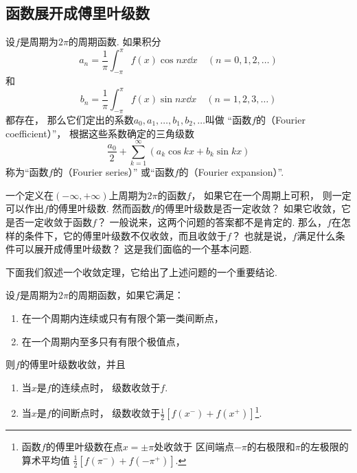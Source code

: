 \subsection{函数展开成傅里叶级数}
\begin{definition}\label{definition:无穷级数.傅里叶级数}
设\(f\)是周期为\(2 \pi\)的周期函数.
如果积分\[
	a_n = \frac{1}{\pi} \int_{-\pi}^\pi f(x) \cos nx \dd{x} \quad(n=0,1,2,\dotsc)
\]和\[
	b_n = \frac{1}{\pi} \int_{-\pi}^\pi f(x) \sin nx \dd{x} \quad(n=1,2,3,\dotsc)
\]都存在，
那么它们定出的系数\(a_0,a_1,\dotsc,b_1,b_2,\dotsc\)叫做%
“函数\(f\)的（Fourier coefficient）”，
根据这些系数确定的三角级数\[
	\frac{a_0}{2} + \sum_{k=1}^\infty (a_k \cos{kx} + b_k \sin kx)
\]称为“函数\(f\)的（Fourier series）”
或“函数\(f\)的（Fourier expansion）”.
\end{definition}

一个定义在\((-\infty,+\infty)\)上周期为\(2\pi\)的函数\(f\)，
如果它在一个周期上可积，
则一定可以作出\(f\)的傅里叶级数.
然而函数\(f\)的傅里叶级数是否一定收敛？
如果它收敛，它是否一定收敛于函数\(f\)？
一般说来，这两个问题的答案都不是肯定的.
那么，\(f\)在怎样的条件下，它的傅里叶级数不仅收敛，而且收敛于\(f\)？
也就是说，\(f\)满足什么条件可以展开成傅里叶级数？
这是我们面临的一个基本问题.

下面我们叙述一个收敛定理，它给出了上述问题的一个重要结论.
\begin{theorem}\label{theorem:无穷级数.傅里叶级数收敛的狄利克雷充分条件}
设\(f\)是周期为\(2 \pi\)的周期函数，如果它满足：
\begin{enumerate}
\item 在一个周期内连续或只有有限个第一类间断点，
\item 在一个周期内至多只有有限个极值点，
\end{enumerate}
则\(f\)的傅里叶级数收敛，并且
\begin{enumerate}
\item 当\(x\)是\(f\)的连续点时，
级数收敛于\(f\).

\item 当\(x\)是\(f\)的间断点时，
级数收敛于\(\frac{1}{2} [ f(x^-) + f(x^+) ]\)\footnote{%
函数\(f\)的傅里叶级数在点\(x=\pm\pi\)处收敛于%
区间端点\(-\pi\)的右极限和\(\pi\)的左极限的算术平均值%
\(\frac{1}{2} [ f(\pi^-) + f(-\pi^+) ]\).}.
\end{enumerate}
\end{theorem}


